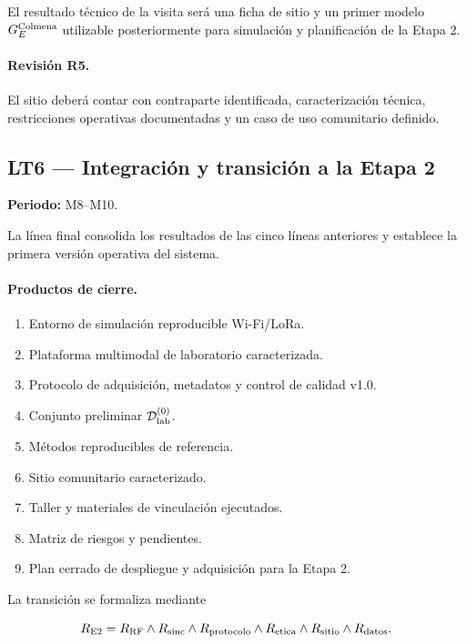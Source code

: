 El resultado técnico de la visita será una ficha de sitio y un primer modelo
$G_E^{\rm Colmena}$ utilizable posteriormente para simulación y planificación de la
Etapa 2.

\paragraph{Revisión R5.}
El sitio deberá contar con contraparte identificada, caracterización técnica, restricciones
operativas documentadas y un caso de uso comunitario definido.

\subsection{LT6 --- Integración y transición a la Etapa 2}
\label{sec:wp6_stage1}

\textbf{Periodo:} M8--M10.

La línea final consolida los resultados de las cinco líneas anteriores y establece la primera
versión operativa del sistema.

\paragraph{Productos de cierre.}
\begin{enumerate}[label=\textbf{P6.\arabic*:},leftmargin=3em]
    \item Entorno de simulación reproducible Wi-Fi/LoRa.
    \item Plataforma multimodal de laboratorio caracterizada.
    \item Protocolo de adquisición, metadatos y control de calidad v1.0.
    \item Conjunto preliminar $\mathcal D_{\rm lab}^{(0)}$.
    \item Métodos reproducibles de referencia.
    \item Sitio comunitario caracterizado.
    \item Taller y materiales de vinculación ejecutados.
    \item Matriz de riesgos y pendientes.
    \item Plan cerrado de despliegue y adquisición para la Etapa 2.
\end{enumerate}

La transición se formaliza mediante

\begin{equation}
R_{\rm E2}=
R_{\rm RF}\land
R_{\rm sinc}\land
R_{\rm protocolo}\land
R_{\rm etica}\land
R_{\rm sitio}\land
R_{\rm datos}.
\label{eq:stage2_gate}
\end{equation}

